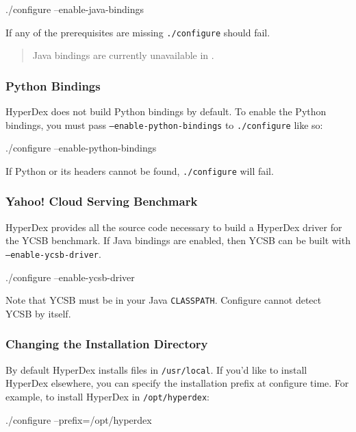 \begin{consolecode}
./configure --enable-java-bindings
\end{consolecode}

If any of the prerequisites are missing \texttt{./configure} should fail.

\begin{quote}
Java bindings are currently unavailable in \HyperDexVersion.
\end{quote}

\subsubsection{Python Bindings}

HyperDex does not build Python bindings by default.  To enable the Python
bindings, you must pass \texttt{--enable-python-bindings} to
\texttt{./configure} like so:

\begin{consolecode}
./configure --enable-python-bindings
\end{consolecode}

If Python or its headers cannot be found, \texttt{./configure} will fail.

\subsubsection{Yahoo! Cloud Serving Benchmark}

HyperDex provides all the source code necessary to build a HyperDex driver
for the YCSB benchmark.  If Java bindings are enabled, then YCSB can be built
with \texttt{--enable-ycsb-driver}.

\begin{consolecode}
./configure --enable-ycsb-driver
\end{consolecode}

Note that YCSB must be in your Java \texttt{CLASSPATH}.  Configure cannot detect
YCSB by itself.

\subsubsection{Changing the Installation Directory}

By default HyperDex installs files in \texttt{/usr/local}.  If you'd like to
install HyperDex elsewhere, you can specify the installation prefix at configure
time.  For example, to install HyperDex in \texttt{/opt/hyperdex}:

\begin{consolecode}
./configure --prefix=/opt/hyperdex
\end{consolecode}

